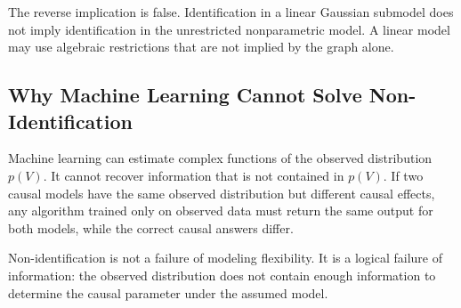 The reverse implication is false. Identification in a linear Gaussian submodel
does not imply identification in the unrestricted nonparametric model. A linear
model may use algebraic restrictions that are not implied by the graph alone.

\subsection{Why Machine Learning Cannot Solve Non-Identification}

Machine learning can estimate complex functions of the observed distribution
$p(V)$. It cannot recover information that is not contained in $p(V)$. If two
causal models have the same observed distribution but different causal effects,
any algorithm trained only on observed data must return the same output for both
models, while the correct causal answers differ.

\begin{keyidea}
Non-identification is not a failure of modeling flexibility. It is a logical
failure of information: the observed distribution does not contain enough
information to determine the causal parameter under the assumed model.
\end{keyidea}
